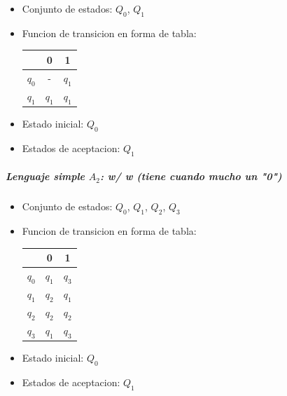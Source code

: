 \documentclass[a4paper, 12pt]{article}
\begin{document}
\begin{itemize}
    \item Conjunto de estados: \( Q_0 \),  \( Q_1 \)
    \item Funcion de transicion en forma de tabla:
    \newline

    \hspace{5cm}
    \begin{tabular}{|c|c|c|}
    \hline
     & 0 & 1 \\
    \hline
    \( q_0 \) &  - & \( q_1 \) \\
    
    \( q_1 \)& \( q_1 \) & \( q_1 \) \\
    \hline
    \end{tabular}

    \item Estado inicial: \( Q_0 \)
    \item Estados de aceptacion: \( Q_1 \)
    
\end{itemize}

\subparagraph{Lenguaje simple \( A_2 \): {w/ w (tiene cuando mucho un "0")}}

\begin{itemize}
    \item Conjunto de estados: \( Q_0 \),  \( Q_1 \), \( Q_2 \), \( Q_3 \)
    \item Funcion de transicion en forma de tabla:
    \newline

    \hspace{5cm}
    \begin{tabular}{|c|c|c|}
    \hline
     & 0 & 1 \\
    \hline
    
    \( q_0 \) & \( q_1 \) & \( q_3 \) \\
    
    \( q_1 \) & \( q_2 \) & \( q_1 \) \\

    \( q_2 \) & \( q_2 \) & \( q_2 \) \\

    \( q_3 \) & \( q_1 \) & \( q_3 \) \\
    
    \hline
    \end{tabular}

    \item Estado inicial: \( Q_0 \)
    \item Estados de aceptacion: \( Q_1 \)
    
\end{itemize}
\end{document}
